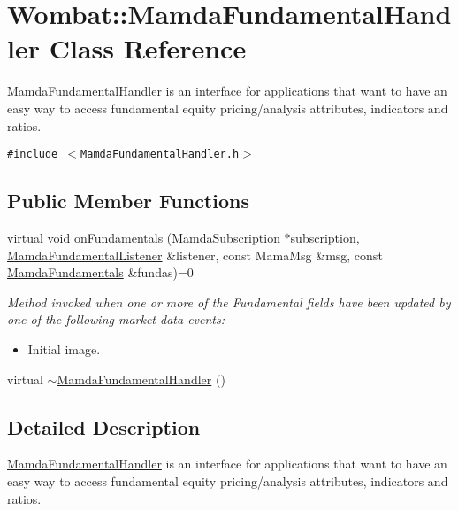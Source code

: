 \hypertarget{classWombat_1_1MamdaFundamentalHandler}{
\section{Wombat::Mamda\-Fundamental\-Handler Class Reference}
\label{classWombat_1_1MamdaFundamentalHandler}
}
\hyperlink{classWombat_1_1MamdaFundamentalHandler}{Mamda\-Fundamental\-Handler} is an interface for applications that want to have an easy way to access fundamental equity pricing/analysis attributes, indicators and ratios.  


{\tt \#include $<$Mamda\-Fundamental\-Handler.h$>$}

\subsection*{Public Member Functions}
\begin{CompactItemize}
\item 
virtual void \hyperlink{classWombat_1_1MamdaFundamentalHandler_bfa96c33f4391803876657b78a1a2c82}{on\-Fundamentals} (\hyperlink{classWombat_1_1MamdaSubscription}{Mamda\-Subscription} $\ast$subscription, \hyperlink{classWombat_1_1MamdaFundamentalListener}{Mamda\-Fundamental\-Listener} \&listener, const Mama\-Msg \&msg, const \hyperlink{classWombat_1_1MamdaFundamentals}{Mamda\-Fundamentals} \&fundas)=0
\begin{CompactList}\small\item\em Method invoked when one or more of the Fundamental fields have been updated by one of the following market data events:\begin{itemize}
\item Initial image. \end{itemize}
\item\end{CompactList}\item 
virtual \hyperlink{classWombat_1_1MamdaFundamentalHandler_a22288a7d092f7455206df07d7a08724}{$\sim$Mamda\-Fundamental\-Handler} ()
\end{CompactItemize}


\subsection{Detailed Description}
\hyperlink{classWombat_1_1MamdaFundamentalHandler}{Mamda\-Fundamental\-Handler} is an interface for applications that want to have an easy way to access fundamental equity pricing/analysis attributes, indicators and ratios. 

